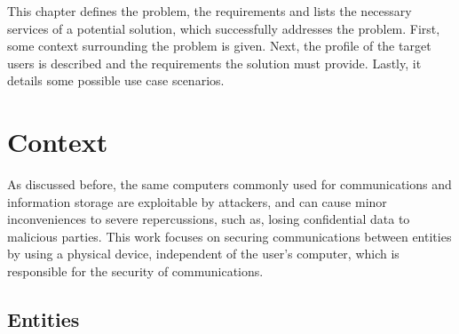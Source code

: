 \cleardoublepage
\label{chap:problem}

This chapter defines the problem, the requirements and lists the necessary services of a potential solution, which successfully addresses the problem.
First, some context surrounding the problem is given. Next, the profile of the target users is described and the requirements the solution must provide. Lastly, it details some possible use case scenarios.

\section{Context}\label{chap:problem:context}

As discussed before, the same computers commonly used for communications and information storage are exploitable by attackers, and can cause minor inconveniences to severe repercussions, such as, losing confidential data to malicious parties.
This work focuses on securing communications between entities by using a physical device, independent of the user's computer, which is responsible for the security of communications.

\subsection{Entities}\label{chap:problem:entities}


